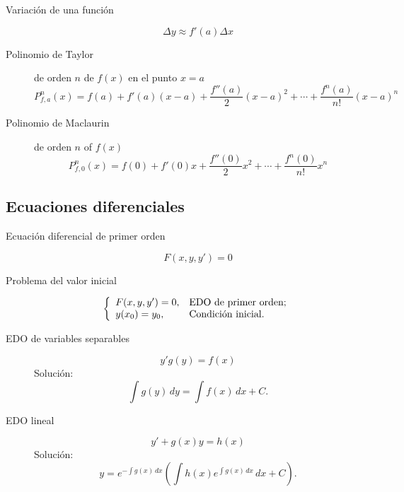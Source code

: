 \begin{multicols}{2}
	\begin{tcolorbox}[hbox, title=Aproximación de funciones]
		\begin{minipage}{0.4\textwidth}
			\flushleft
			\begin{description}
				\item[Variación de una función]
				\[
				  \Delta y\approx f'(a)\Delta x
				\]
				\item[Polinomio de Taylor] de orden $n$ de $f(x)$ en el punto $x=a$
				\[
					P^n_{f,a}(x)=f(a)+f'(a)(x-a)+\frac{f''(a)}{2}(x-a)^2+\cdots+\frac{f^n(a)}{n!}(x-a)^n
				\]
				\item[Polinomio de Maclaurin] de orden $n$ of $f(x)$
				\[
					P^n_{f,0}(x)=f(0)+f'(0)x+\frac{f''(0)}{2}x^2+\cdots+\frac{f^n(0)}{n!}x^n
				\]
			\end{description}
		\end{minipage}
	\end{tcolorbox}



\subsection*{Ecuaciones diferenciales}

	\begin{tcolorbox}[hbox, title=Ecuación diferencial de primer orden]
		\begin{minipage}{0.4\textwidth}
			\flushleft
			\begin{description}
				\item[Ecuación diferencial de primer orden] 				      
				\[
					F(x,y,y')=0
				\]
				\item[Problema del valor inicial]
				\[
					\left\{
					\begin{array}{ll}
						F(x,y,y')=0, & \hbox{EDO de primer orden;} \\
						y(x_0)=y_0, & \hbox{Condición inicial.} \\
					\end{array}
					\right.    
				\]
			\end{description}
		\end{minipage}
	\end{tcolorbox}

	\begin{tcolorbox}[hbox, title=Resolución de EDO de primer orden]
		\begin{minipage}{0.4\textwidth}
			\flushleft
			\begin{description}
				\item[EDO de variables separables] 
			  \[
			    y'g(y)=f(x)
				\]
				Solución:
				\[
					\int g(y)\,dy = \int f(x)\,dx+C.
				\]
				\item[EDO lineal] 
			  \[
					y'+g(x)y = h(x)
				\]
				Solución:
				\[
					y=e^{-\int g(x)\,dx}\left(\int h(x)e^{\int g(x)\,dx}\,dx+C\right).
				\]
			\end{description}
		\end{minipage}
	\end{tcolorbox}




\end{multicols}
